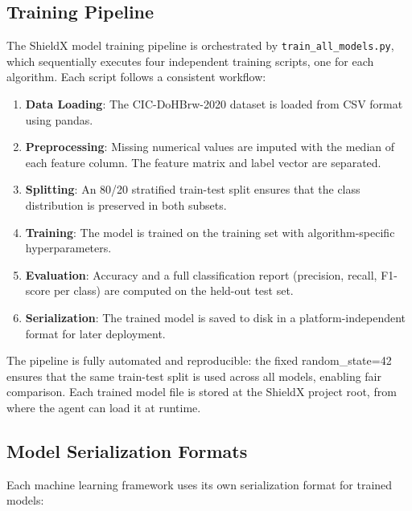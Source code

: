 \documentclass[../Main.tex]{subfiles}
\begin{document}
\subsection{Training Pipeline}

The ShieldX model training pipeline is orchestrated by \texttt{train\_all\_models.py}, which sequentially executes four independent training scripts, one for each algorithm. Each script follows a consistent workflow:

\begin{enumerate}
    \item \textbf{Data Loading}: The CIC-DoHBrw-2020 dataset is loaded from CSV format using pandas.
    \item \textbf{Preprocessing}: Missing numerical values are imputed with the median of each feature column. The feature matrix and label vector are separated.
    \item \textbf{Splitting}: An 80/20 stratified train-test split ensures that the class distribution is preserved in both subsets.
    \item \textbf{Training}: The model is trained on the training set with algorithm-specific hyperparameters.
    \item \textbf{Evaluation}: Accuracy and a full classification report (precision, recall, F1-score per class) are computed on the held-out test set.
    \item \textbf{Serialization}: The trained model is saved to disk in a platform-independent format for later deployment.
\end{enumerate}

The pipeline is fully automated and reproducible: the fixed random\_state=42 ensures that the same train-test split is used across all models, enabling fair comparison. Each trained model file is stored at the ShieldX project root, from where the agent can load it at runtime.

\subsection{Model Serialization Formats}

Each machine learning framework uses its own serialization format for trained models:
\end{document}

